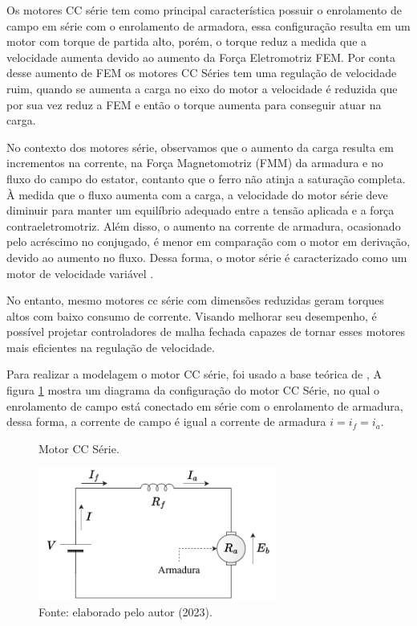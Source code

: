Os motores CC série tem como principal característica possuir o enrolamento de campo em série com o enrolamento de armadora, essa configuração resulta em um motor com torque de partida alto, porém, o torque reduz a medida que a velocidade aumenta devido ao aumento da Força Eletromotriz FEM. Por conta desse aumento de FEM os motores CC Séries tem uma regulação de velocidade ruim, quando se aumenta a carga no eixo do motor a velocidade é reduzida que por sua vez reduz a FEM e então o torque aumenta para conseguir atuar na carga.


No contexto dos motores série, observamos que o aumento da carga resulta em incrementos na corrente, na Força Magnetomotriz (FMM) da armadura e no fluxo do campo do estator, contanto que o ferro não atinja a saturação completa. À medida que o fluxo aumenta com a carga, a velocidade do motor série deve diminuir para manter um equilíbrio adequado entre a tensão aplicada e a força contraeletromotriz. Além disso, o aumento na corrente de armadura, ocasionado pelo acréscimo no conjugado, é menor em comparação com o motor em derivação, devido ao aumento no fluxo. Dessa forma, o motor série é caracterizado como um motor de velocidade variável .


No entanto, mesmo motores cc série com dimensões reduzidas geram torques altos com baixo consumo de corrente. Visando melhorar seu desempenho, é possível projetar controladores de malha fechada capazes de tornar esses motores mais eficientes na regulação de velocidade.

Para realizar a modelagem o motor CC série, foi usado a base teórica de \cite{jesus}, A figura \ref{fig4:image_02} mostra um diagrama da configuração do motor CC Série, no qual o enrolamento de campo está conectado em série com o enrolamento de armadura, dessa forma, a  corrente de campo é igual a corrente de armadura $ i = i_f = i_a$.


\begin{figure}[!h]
	\centering
	\caption{Motor CC Série.}
	\includegraphics[width=0.7\textwidth]{Capitulos/2_aeropendulo/4_figuras/esquema_motor_cc.pdf}
	\caption*{Fonte:  elaborado pelo autor (2023).}
	\label{fig4:image_02}
\end{figure}

